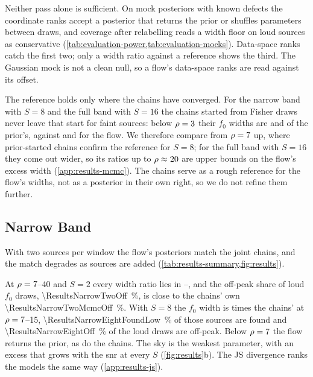 Neither pass alone is sufficient. On mock posteriors with known defects the coordinate ranks accept
a posterior that returns the prior or shuffles parameters between draws, and coverage after
relabelling reads a width floor on loud sources as conservative (\cref{tab:evaluation-power,tab:evaluation-mocks}).
Data-space ranks catch the first two; only a width ratio against a reference shows the third. The
Gaussian mock is not a clean null, so a flow's data-space ranks are read against its offset.

The reference holds only where the chains have converged. For the narrow band with $S=8$ and the
full band with $S=16$ the chains started from Fisher draws never leave that start for faint
sources: below $\rho=3$ their $f_0$ widths are \ResultsNarrowEightFaintMcmcPrior{}
and \ResultsFullSixteenFaintMcmcPrior{} of the prior's, against \ResultsNarrowEightFaintFlowPrior{}
and \ResultsFullSixteenFaintFlowPrior{} for the flow. We therefore compare from $\rho=7$ up, where
prior-started chains confirm the reference for $S=8$; for the full band with $S=16$ they come out
wider, so its ratios up to $\rho\approx20$ are upper bounds on the flow's excess width
(\cref{app:results-mcmc}). The chains serve as a rough reference for the flow's widths, not as a posterior in their own
right, so we do not refine them further.


\subsection{Narrow Band}
\label{sec:results-main}\label{sec:results-narrow}

With two sources per window the flow's posteriors match the joint chains, and the match degrades
as sources are added (\cref{tab:results-summary,fig:results}).

At $\rho=7$--40 and $S=2$ every width ratio lies in
\ResultsNarrowTwoWidthLo--\ResultsNarrowTwoWidthHi, and the off-peak share of loud $f_0$ draws,
\qty{\ResultsNarrowTwoOff}{\percent}, is close to the chains' own \qty{\ResultsNarrowTwoMcmcOff}{\percent}.
With $S=8$ the $f_0$ width is \ResultsNarrowEightFzeroLow{} times the chains' at $\rho=7$--15,
\qty{\ResultsNarrowEightFoundLow}{\percent} of those sources are found and
\qty{\ResultsNarrowEightOff}{\percent} of the loud draws are off-peak. Below $\rho=7$ the flow
returns the prior, as do the chains. The sky is the weakest parameter, with an excess that grows
with the \ac{snr} at every $S$ (\cref{fig:results}b). The JS divergence ranks the models the same
way (\cref{app:results-js}).

